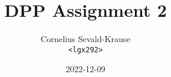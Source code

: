 \documentclass{article}
\begin{document}
\title{DPP Assignment 2}
\author{Cornelius Sevald-Krause \\ \texttt{<lgx292>}}
\date{2022-12-09}
\maketitle
\end{document}
